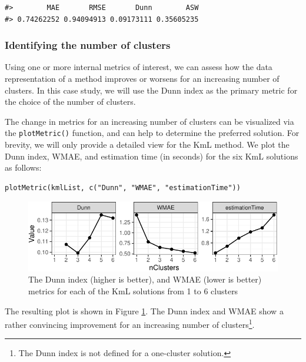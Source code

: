 \begin{verbatim}
#>        MAE       RMSE       Dunn        ASW 
#> 0.74262252 0.94094913 0.09173111 0.35605235
\end{verbatim}

\subsubsection{Identifying the number of clusters}\label{identifying-the-number-of-clusters-1}

Using one or more internal metrics of interest, we can assess how the data representation of a method improves or worsens for an increasing number of clusters. In this case study, we will use the Dunn index as the primary metric for the choice of the number of clusters.

The change in metrics for an increasing number of clusters can be visualized via the \texttt{plotMetric()} function, and can help to determine the preferred solution. For brevity, we will only provide a detailed view for the KmL method. We plot the Dunn index, WMAE, and estimation time (in seconds) for the six KmL solutions as follows:

\begin{verbatim}
plotMetric(kmlList, c("Dunn", "WMAE", "estimationTime"))
\end{verbatim}

\begin{figure}

{\centering \includegraphics{figures/numclusmetrics-1} 

}

\caption{The Dunn index (higher is better), and WMAE (lower is better) metrics for each of the KmL solutions from 1 to 6 clusters}\label{fig:numclusmetrics}
\end{figure}

The resulting plot is shown in Figure \ref{fig:numclusmetrics}. The Dunn index and WMAE show a rather convincing improvement for an increasing number of clusters\footnote{The Dunn index is not defined for a one-cluster solution.}.


